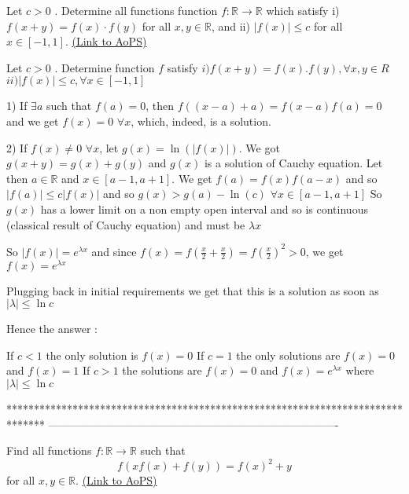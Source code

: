 \begin{problem}
	Let $ c > 0$ . Determine all functions function $f: \mathbb R \to \mathbb R$ which satisfy
 i) $f(x + y) = f(x)\cdot f(y)$ for all $x,y \in \mathbb R$, and
 ii) $|f(x)| \le c$ for all $x \in [ -1,1]$.
	\flushright \href{https://artofproblemsolving.com/community/c6h320308}{(Link to AoPS)}
\end{problem}



\begin{solution}
	\begin{tcolorbox}Let $ c > 0$ . Determine function $ f$ satisfy
 $ i) f(x + y) = f(x).f(y), \forall x,y \in R$
 $ ii)|f(x)| \le c, \forall x \in [ - 1,1]$\end{tcolorbox}

1) If $ \exists a$ such that $ f(a)=0$, then $ f((x-a)+a)=f(x-a)f(a)=0$ and we get $ f(x)=0$ $ \forall x$, which, indeed, is a solution.

2) If $ f(x)\ne 0$ $ \forall x$, let $ g(x)=\ln(|f(x)|)$. We got $ g(x+y)=g(x)+g(y)$ and $ g(x)$ is a solution of Cauchy equation.
Let then $ a\in\mathbb R$ and $ x\in[a-1,a+1]$. We get $ f(a)=f(x)f(a-x)$ and so $ |f(a)|\le c|f(x)|$ and so $ g(x)>g(a)-\ln(c)$ $ \forall x\in[a-1,a+1]$
So $ g(x)$ has a lower limit on a non empty open interval and so is continuous (classical result of Cauchy equation) and must be $ \lambda x$

So $ |f(x)|=e^{\lambda x}$ and since $ f(x)=f(\frac x2+\frac x2)=f(\frac x2)^2>0$, we get $ f(x)=e^{\lambda x}$

Plugging back in initial requirements we get that this is a solution as soon as $ |\lambda|\le \ln c$

Hence the answer :

If $ c<1$ the only solution is $ f(x)=0$
If $ c=1$ the only solutions are $ f(x)=0$ and $ f(x)=1$
If $ c>1$ the solutions are $ f(x)=0$ and $ f(x)=e^{\lambda x}$ where $ |\lambda|\le \ln c$
\end{solution}
*******************************************************************************
-------------------------------------------------------------------------------

\begin{problem}
	Find all functions $f: \mathbb R \to \mathbb R$ such that \[ f( xf(x) + f(y) ) = f(x)^2 + y \] for all $x,y\in \mathbb R$.
	\flushright \href{https://artofproblemsolving.com/community/c6h320331}{(Link to AoPS)}
\end{problem}



